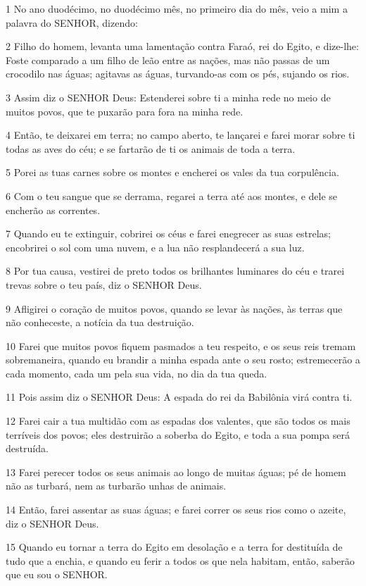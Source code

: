 \par 1 No ano duodécimo, no duodécimo mês, no primeiro dia do mês, veio a mim a palavra do SENHOR, dizendo:
\par 2 Filho do homem, levanta uma lamentação contra Faraó, rei do Egito, e dize-lhe: Foste comparado a um filho de leão entre as nações, mas não passas de um crocodilo nas águas; agitavas as águas, turvando-as com os pés, sujando os rios.
\par 3 Assim diz o SENHOR Deus: Estenderei sobre ti a minha rede no meio de muitos povos, que te puxarão para fora na minha rede.
\par 4 Então, te deixarei em terra; no campo aberto, te lançarei e farei morar sobre ti todas as aves do céu; e se fartarão de ti os animais de toda a terra.
\par 5 Porei as tuas carnes sobre os montes e encherei os vales da tua corpulência.
\par 6 Com o teu sangue que se derrama, regarei a terra até aos montes, e dele se encherão as correntes.
\par 7 Quando eu te extinguir, cobrirei os céus e farei enegrecer as suas estrelas; encobrirei o sol com uma nuvem, e a lua não resplandecerá a sua luz.
\par 8 Por tua causa, vestirei de preto todos os brilhantes luminares do céu e trarei trevas sobre o teu país, diz o SENHOR Deus.
\par 9 Afligirei o coração de muitos povos, quando se levar às nações, às terras que não conheceste, a notícia da tua destruição.
\par 10 Farei que muitos povos fiquem pasmados a teu respeito, e os seus reis tremam sobremaneira, quando eu brandir a minha espada ante o seu rosto; estremecerão a cada momento, cada um pela sua vida, no dia da tua queda.
\par 11 Pois assim diz o SENHOR Deus: A espada do rei da Babilônia virá contra ti.
\par 12 Farei cair a tua multidão com as espadas dos valentes, que são todos os mais terríveis dos povos; eles destruirão a soberba do Egito, e toda a sua pompa será destruída.
\par 13 Farei perecer todos os seus animais ao longo de muitas águas; pé de homem não as turbará, nem as turbarão unhas de animais.
\par 14 Então, farei assentar as suas águas; e farei correr os seus rios como o azeite, diz o SENHOR Deus.
\par 15 Quando eu tornar a terra do Egito em desolação e a terra for destituída de tudo que a enchia, e quando eu ferir a todos os que nela habitam, então, saberão que eu sou o SENHOR.
